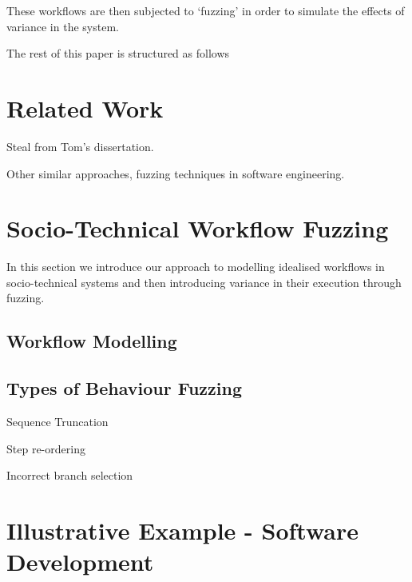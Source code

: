\documentclass[11pt]{article}
\begin{document}
  These workflows are then subjected to
`fuzzing' in order to simulate the effects of variance in the system.

The rest of this paper is structured as follows


\section{Related Work}


Steal from Tom's dissertation.

Other similar approaches, fuzzing techniques in software engineering.


\section{Socio-Technical Workflow Fuzzing}


In this section we introduce our approach to modelling idealised workflows in
socio-technical systems and then introducing variance in their execution through
fuzzing.


\subsection{Workflow Modelling}




\subsection{Types of Behaviour Fuzzing}


Sequence Truncation

Step re-ordering

Incorrect branch selection


\section{Illustrative Example - Software Development}

\end{document}
